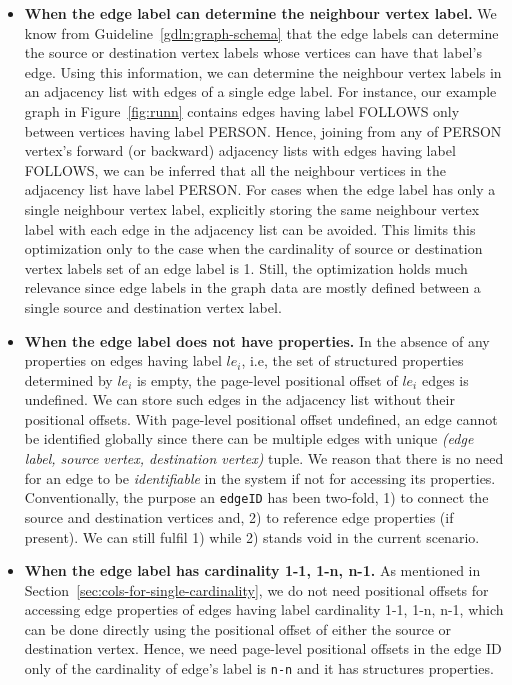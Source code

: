 \begin{itemize}
	\item \textbf{When the edge label can determine the neighbour vertex label.} We know from Guideline~\ref{gdln:graph-schema} that the edge labels can determine the source or destination vertex labels whose vertices can have that label's edge. Using this information, we can determine the neighbour vertex labels in an adjacency list with edges of a single edge label. For instance, our example graph in Figure~\ref{fig:runn} contains edges having label FOLLOWS only between vertices having label PERSON. Hence, joining from any of PERSON vertex's forward (or backward) adjacency lists with edges having label FOLLOWS, we can be inferred that all the neighbour vertices in the adjacency list have label PERSON. For cases when the edge label has only a single neighbour vertex label, explicitly storing the same neighbour vertex label with each edge in the adjacency list can be avoided. This limits this optimization only to the case when the cardinality of source or destination vertex labels set of an edge label is 1. Still, the optimization holds much relevance since edge labels in the graph data are mostly defined between a single source and destination vertex label. 
	
	\item \textbf{When the edge label does not have properties.} In the absence of any properties on edges having label $le_i$, i.e, the set of structured properties determined by $le_i$ is empty, the page-level positional offset of $le_i$ edges is undefined. We can store such edges in the adjacency list without their positional offsets. With page-level positional offset undefined, an edge cannot be identified globally since there can be multiple edges with unique \emph{(edge label, source vertex, destination vertex)} tuple. We reason that there is no need for an edge to be \emph{identifiable} in the system if not for accessing its properties. Conventionally, the purpose an  \texttt{edgeID} has been two-fold, 1) to connect the source and destination vertices and, 2) to reference edge properties (if present). We can still fulfil 1) while 2) stands void in the current scenario. 
	
	\item \textbf{When the edge label has cardinality 1-1, 1-n, n-1.} As mentioned in Section~\ref{sec:cols-for-single-cardinality}, we do not need positional offsets for accessing edge properties of edges having label cardinality 1-1, 1-n, n-1, which can be done directly using the positional offset of either the source or destination vertex. Hence, we need page-level positional offsets in the edge ID only of the cardinality of edge's label is \texttt{n-n} and it has structures properties.
	
\end{itemize}

